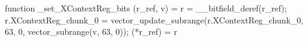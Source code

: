 function _set_XContextReg_bits (r_ref, v) = {
    r = __bitfield_deref(r_ref);
    r.XContextReg_chunk_0 = vector_update_subrange(r.XContextReg_chunk_0, 63, 0, vector_subrange(v, 63, 0));
    (*r_ref) = r
}
